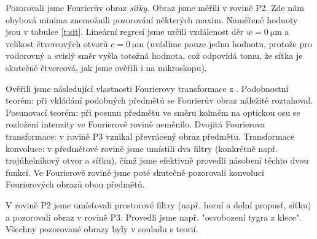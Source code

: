 


Pozorovali jsme Fourierův obraz \emph{síťky}. 
Obraz jsme měřili v rovině P2. Zde nám ohybová minima znemožnili pozorování některých maxim. Naměřené hodnoty jsou v tabulce \ref{t:sit}. Lineární regresí jsme určili vzdálenost děr $w=\SI{0}{\micro\metre}$ a velikost čtvercových otvorů $c=\SI{0}{\micro\metre}$ (uvádíme pouze jednu hodnotu, protože pro vodorovný a svislý směr vyšla totožná hodnota, což odpovídá tomu, že síťka je skutečně čtvercová, jak jsme ověřili i na mikroskopu).






Ověřili jsme následující vlastnosti Fourierovy transformace z \cite{skripta}. Podobnostní teorém: při vkládání podobných předmětů se Fourierův obraz náležitě roztahoval. Posunovací teorém: při posunu předmětu ve směru kolmém na optickou osu se rozložení intenzity ve Fourierově rovině neměnilo. Dvojitá Fourierova transformace: v rovině P3 vznikal převrácený obraz předmětu. Transformace konvoluce: v předmětové rovině jsme umístili dva filtry (konkrétně např. trojúhelníkový otvor a síťku), čímž jsme efektivně provedli násobení těchto dvou funkcí. Ve Fourierově rovině jsme poté skutečně pozorovali konvoluci Fourierových obrazů obou předmětů.

V rovině P2 jsme umísťovali prostorové filtry (např. horní a dolní propusť, síťku) a pozorovali obraz v rovině P3. Provedli jsme např. "osvobození tygra z klece". Všechny pozorované obrazy byly v souladu s teorií.